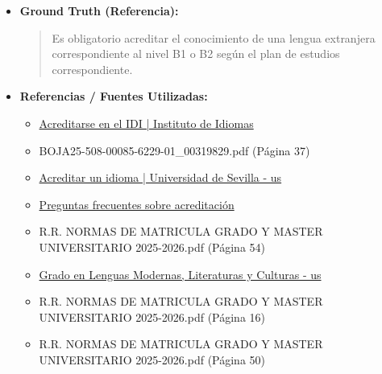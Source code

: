 \documentclass[12pt,a4paper,oneside]{report}
\begin{document}
\begin{itemize}
\begin{itemize}
\begin{quote}
Para más información sobre el proceso de acreditación de idioma, los estudiantes pueden consultar la página web del Instituto de Idiomas de la Universidad de Sevilla o acercarse a la secretaría del centro.
                \end{quote}
          \item \textbf{{Ground Truth (Referencia):}} \\
                \begin{quote}
Es obligatorio acreditar el conocimiento de una lengua extranjera correspondiente al nivel B1 o B2 según el plan de estudios correspondiente.
                \end{quote}
          \item \textbf{{Referencias / Fuentes Utilizadas:}} \\
                \begin{itemize}
                  \item \href{https://institutodeidiomas.us.es/pruebasexamenes-de-acreditacion/acreditarse-en-el-idi}{Acreditarse en el IDI | Instituto de Idiomas}
                  \item BOJA25-508-00085-6229-01\_00319829.pdf (Página 37)
                  \item \href{https://www.us.es/internacional/politica-linguistica/acreditar-un-idioma}{Acreditar un idioma | Universidad de Sevilla - us}
                  \item \href{https://institutodeidiomas.us.es/sites/default/files/documentos/preguntas-frecuentes-sobre-acreditacion\_2.pdf}{Preguntas frecuentes sobre acreditación}
                  \item R.R. NORMAS DE MATRICULA GRADO Y MASTER UNIVERSITARIO 2025-2026.pdf (Página 54)
                  \item \href{https://www.us.es/estudiar/que-estudiar/oferta-de-grados/grado-en-lenguas-modernas-literaturas-y-culturas}{Grado en Lenguas Modernas, Literaturas y Culturas - us}
                  \item R.R. NORMAS DE MATRICULA GRADO Y MASTER UNIVERSITARIO 2025-2026.pdf (Página 16)
                  \item R.R. NORMAS DE MATRICULA GRADO Y MASTER UNIVERSITARIO 2025-2026.pdf (Página 50)
                \end{itemize}
        \end{itemize}


\end{itemize}
\end{document}
